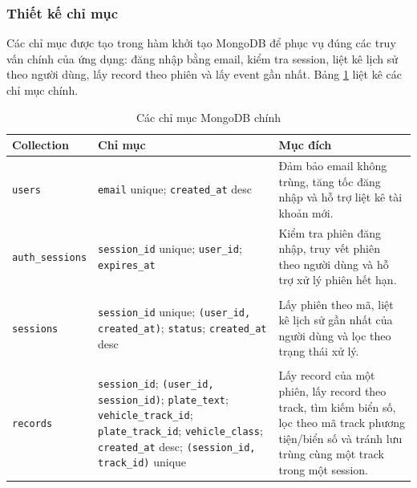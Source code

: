 \documentclass[../DoAn.tex]{subfiles}
\begin{document}
\subsubsection{Thiết kế chỉ mục}

Các chỉ mục được tạo trong hàm khởi tạo MongoDB để phục vụ đúng các truy vấn chính của ứng dụng: đăng nhập bằng email, kiểm tra session, liệt kê lịch sử theo người dùng, lấy record theo phiên và lấy event gần nhất. Bảng \ref{tab:mongodb-indexes} liệt kê các chỉ mục chính.

\begin{table}[htbp]
\centering
\caption{Các chỉ mục MongoDB chính}
\label{tab:mongodb-indexes}
\renewcommand{\arraystretch}{1.12}
\begin{tabular}{|>{\raggedright\arraybackslash}p{3.4cm}|>{\raggedright\arraybackslash}p{5.6cm}|>{\raggedright\arraybackslash}p{5.4cm}|}
\hline
\textbf{Collection} & \textbf{Chỉ mục} & \textbf{Mục đích} \\
\hline
\texttt{users} & \texttt{email} unique; \newline \texttt{created\_at} desc & Đảm bảo email không trùng, tăng tốc đăng nhập và hỗ trợ liệt kê tài khoản mới. \\
\hline
\texttt{auth\_sessions} & \texttt{session\_id} unique; \newline \texttt{user\_id}; \newline \texttt{expires\_at} & Kiểm tra phiên đăng nhập, truy vết phiên theo người dùng và hỗ trợ xử lý phiên hết hạn. \\
\hline
\shortstack[l]{\texttt{recognition\_}\\\texttt{sessions}} & \texttt{session\_id} unique; \newline \texttt{(user\_id, created\_at)}; \newline \texttt{status}; \newline \texttt{created\_at} desc & Lấy phiên theo mã, liệt kê lịch sử gần nhất của người dùng và lọc theo trạng thái xử lý. \\
\hline
\shortstack[l]{\texttt{recognition\_}\\\texttt{records}} & \texttt{session\_id}; \newline \texttt{(user\_id, session\_id)}; \newline \texttt{plate\_text}; \newline \texttt{vehicle\_track\_id}; \newline \texttt{plate\_track\_id}; \newline \texttt{vehicle\_class}; \newline \texttt{created\_at} desc; \newline \texttt{(session\_id, track\_id)} unique & Lấy record của một phiên, lấy record theo track, tìm kiếm biển số, lọc theo mã track phương tiện/biển số và tránh lưu trùng cùng một track trong một session. \\

\end{tabular}
\end{table}
\end{document}
